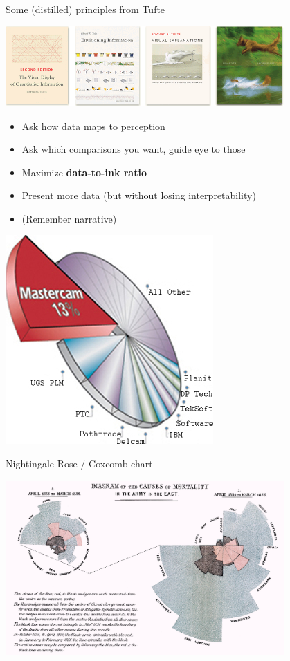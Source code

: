 \documentclass[xcolor=table,aspectratio=169]{beamer}
\begin{document}
\begin{frame}
  {Some (distilled) principles from Tufte}

  \includegraphics[width=0.8\textwidth]{pics/tufte-bookcovers.png}

  \begin{itemize}

  	\item Ask how data maps to perception
    \item Ask which comparisons you want, guide eye to those
    \item Maximize \textbf{data-to-ink ratio}
    \item Present more data (but without losing interpretability)
    \item (Remember  narrative)
  \end{itemize}
\end{frame}


\begin{frame}
  \includegraphics[height=\textheight]{pics/junk.jpg}
\end{frame}



\begin{frame}
  {Nightingale Rose / Coxcomb chart}
  
  \includegraphics[width=0.8\textwidth]{pics/Nightingale-mortality.jpg}
  
\end{frame}
\end{document}
